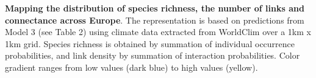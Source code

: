 \documentclass[12pt]{article}
\begin{document}
\textbf{Mapping the distribution of species richness, the number of links and
connectance across Europe}. The representation is based on predictions from
Model 3 (see Table 2) using climate data extracted from WorldClim over a 1km x
1km grid. Species richness is obtained by summation of individual occurrence
probabilities, and link density by summation of interaction probabilities.
Color gradient ranges from low values (dark blue) to high values (yellow).

\newpage











\end{document}
